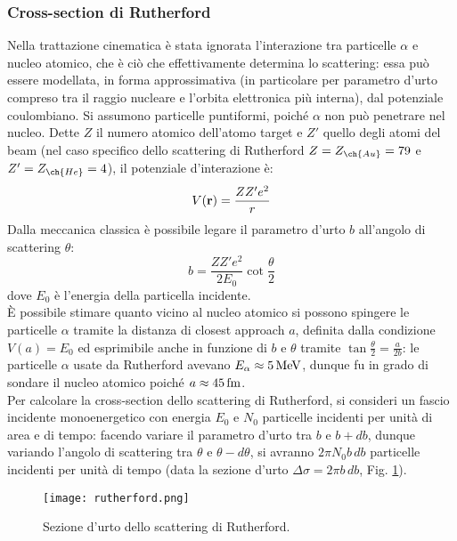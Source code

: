 \subsubsection{Cross-section di Rutherford}

Nella trattazione cinematica è stata ignorata l'interazione tra particelle $ \alpha $ e nucleo atomico, che è ciò che effettivamente determina lo scattering: essa può essere modellata, in forma approssimativa (in particolare per parametro d'urto compreso tra il raggio nucleare e l'orbita elettronica più interna), dal potenziale coulombiano. Si assumono particelle puntiformi, poiché $\alpha$ non può penetrare nel nucleo. Dette $ Z $ il numero atomico dell'atomo target e $ Z' $ quello degli atomi del beam (nel caso specifico dello scattering di Rutherford $ Z = Z_{\ch{Au}} = 79 $ e $ Z' = Z_{\ch{He}} = 4 $), il potenziale d'interazione è:
\begin{equation}
	V(\mathbf{r}) = \frac{ZZ' e^2}{r}
	\label{eq:4}
\end{equation}
Dalla meccanica classica è possibile legare il parametro d'urto $ b $ all'angolo di scattering $ \theta $:
\begin{equation}
	b = \frac{ZZ' e^2}{2 E_0} \cot \frac{\theta}{2}
	\label{eq:5}
\end{equation}
dove $ E_0 $ è l'energia della particella incidente.\\
È possibile stimare quanto vicino al nucleo atomico si possono spingere le particelle $ \alpha $ tramite la distanza di closest approach $ a $, definita dalla condizione $ V(a) = E_0 $ ed esprimibile anche in funzione di $ b $ e $ \theta $ tramite $ \tan \frac{\theta}{2} = \frac{a}{2b} $: le particelle $ \alpha $ usate da Rutherford avevano $ E_{\alpha} \approx 5\,\text{MeV} $, dunque fu in grado di sondare il nucleo atomico poiché $ a \approx 45\,\text{fm} $.\\
Per calcolare la cross-section dello scattering di Rutherford, si consideri un fascio incidente monoenergetico con energia $ E_0 $ e $ N_0 $ particelle incidenti per unità di area e di tempo: facendo variare il parametro d'urto tra $ b $ e $ b + db $, dunque variando l'angolo di scattering tra $ \theta $ e $ \theta - d \theta $, si avranno $ 2\pi N_0 b \,db $ particelle incidenti per unità di tempo (data la sezione d'urto $ \Delta\sigma = 2\pi b \,db $, Fig. \ref{rutherford}).
\begin{figure}
	\centering
	\texttt{[image: rutherford.png]}
	\caption{Sezione d'urto dello scattering di Rutherford.}
	\label{rutherford}
\end{figure}

